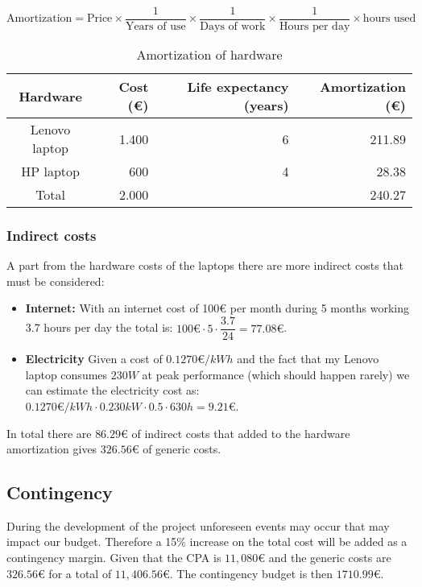 \begin{equation}\label{eq:amort}
    \text{Amortization} = \text{Price} \times \frac{1}{\text{Years of use}}
    \times \frac{1}{\text{Days of work}} \times \frac{1}{\text{Hours per day}}
    \times \text{hours used}
\end{equation}

\begin{table}[H]
    \centering
    \caption{Amortization of hardware}\label{table:amort}
    \begin{tabular}{crrr}
        \toprule
        Hardware & Cost (€) & Life expectancy (years) & Amortization (€) \\
        \midrule
        Lenovo laptop & 1.400 & 6 & 211.89 \\
        HP laptop & 600 & 4 & 28.38\\
        \midrule
        Total & 2.000 &   & 240.27 \\
        \bottomrule
    \end{tabular}
\end{table}

\subsubsection{Indirect costs}

A part from the hardware costs of the laptops there are more indirect costs that
must be considered:

\begin{itemize}
    \item \textbf{Internet:} With an internet cost of 100€ per month during 5
        months working 3.7 hours per day the total is: $100€ \cdot 5 \cdot
        \dfrac{3.7}{24} = 77.08€$.
    \item \textbf{Electricity} Given a cost of $0.1270€/kWh$ and the fact that
        my Lenovo laptop consumes $230W$ at peak performance (which should
        happen rarely) we can estimate the electricity cost as:
        $0.1270€/kWh \cdot 0.230kW \cdot 0.5 \cdot 630h = 9.21€$.
\end{itemize}

In total there are $86.29€$ of indirect costs that added to the hardware
amortization gives $326.56€$ of generic costs.

\subsection{Contingency}

During the development of the project unforeseen events may occur that may
impact our budget. Therefore a 15\% increase on the total cost will be added as
a contingency margin. Given that the CPA is $11,080€$ and the generic costs are
$326.56€$ for a total of $11,406.56€$. The contingency budget is then $1710.99€$.


